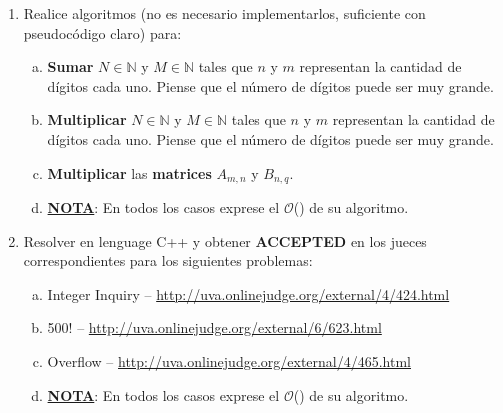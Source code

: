 \begin{enumerate}
	\item Realice algoritmos (no es necesario implementarlos, suficiente con pseudocódigo claro) para:
		\begin{enumerate}[a)] 
			\item \textbf{Sumar} $N \in \mathbb{N}$ y  $M \in \mathbb{N}$ tales que $n$ y $m$ representan la cantidad de dígitos cada uno. Piense que el número
			de dígitos puede ser muy grande.
			\item \textbf{Multiplicar} $N \in \mathbb{N}$ y  $M \in \mathbb{N}$ tales que $n$ y $m$ representan la cantidad de dígitos cada uno. Piense que el número
			de dígitos puede ser muy grande.
			\item \textbf{Multiplicar} las \textbf{matrices} $A_{m,n}$ y $B_{n,q}$.
			
			\item[] \underline{\textbf{NOTA}}: En todos los casos exprese el $\mathcal{O}$() de su algoritmo.
		\end{enumerate}
	
	\item Resolver en lenguage C++ y obtener \textbf{ACCEPTED} en los jueces correspondientes para los siguientes problemas:	
	
	\begin{enumerate}[a)]
		\item Integer Inquiry  -- \href{http://uva.onlinejudge.org/external/4/424.html}{http://uva.onlinejudge.org/external/4/424.html}
		\item 500!  -- \href{http://uva.onlinejudge.org/external/6/623.html}{http://uva.onlinejudge.org/external/6/623.html}
		\item Overflow -- \href{http://uva.onlinejudge.org/external/4/465.html}{http://uva.onlinejudge.org/external/4/465.html} 
		
		\item[] \underline{\textbf{NOTA}}: En todos los casos exprese el $\mathcal{O}$() de su algoritmo.
	\end{enumerate}


\end{enumerate}


